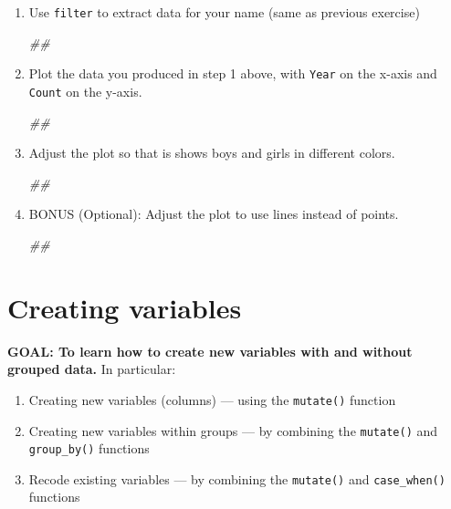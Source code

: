 \documentclass[
]{book}
\newenvironment{Shaded}{\begin{snugshade}}{\end{snugshade}}
\newcommand{\CommentTok}[1]{\textcolor[rgb]{0.56,0.35,0.01}{\textit{#1}}}
\providecommand{\tightlist}{%
  \setlength{\itemsep}{0pt}\setlength{\parskip}{0pt}}
\begin{document}
\begin{enumerate}
\def\labelenumi{\arabic{enumi}.}
\item
  Use \texttt{filter} to extract data for your name (same as previous exercise)

\begin{Shaded}
\begin{Highlighting}[]
\CommentTok{##}
\end{Highlighting}
\end{Shaded}
\item
  Plot the data you produced in step 1 above, with \texttt{Year} on the x-axis
  and \texttt{Count} on the y-axis.

\begin{Shaded}
\begin{Highlighting}[]
\CommentTok{##}
\end{Highlighting}
\end{Shaded}
\item
  Adjust the plot so that is shows boys and girls in different colors.

\begin{Shaded}
\begin{Highlighting}[]
\CommentTok{##}
\end{Highlighting}
\end{Shaded}
\item
  BONUS (Optional): Adjust the plot to use lines instead of points.

\begin{Shaded}
\begin{Highlighting}[]
\CommentTok{##}
\end{Highlighting}
\end{Shaded}
\end{enumerate}

\hypertarget{creating-variables}{%
\section{Creating variables}\label{creating-variables}}

\textbf{GOAL: To learn how to create new variables with and without grouped data.} In particular:

\begin{enumerate}
\def\labelenumi{\arabic{enumi}.}
\tightlist
\item
  Creating new variables (columns) --- using the \texttt{mutate()} function
\item
  Creating new variables within groups --- by combining the \texttt{mutate()} and \texttt{group\_by()} functions
\item
  Recode existing variables --- by combining the \texttt{mutate()} and \texttt{case\_when()} functions
\end{enumerate}
\end{document}
